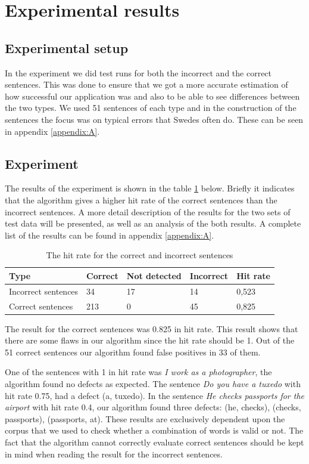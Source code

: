 \documentclass[a4paper,12pt]{article}
\begin{document}
\section{Experimental results}
\label{sec:experimentalresults}

\subsection{Experimental setup}
In the experiment we did test runs for both the incorrect and the correct sentences. This was done to ensure that we got a more accurate estimation of how successful our application was and also to be able to see differences between the two types. We used 51 sentences of each type and in the construction of the sentences the focus was on typical errors that Swedes often do. These can be seen in appendix \ref{appendix:A}.

\subsection{Experiment}
The results of the experiment is shown in the table \ref{table:results} below. Briefly it indicates that the algorithm gives a higher hit rate of the correct sentences than the incorrect sentences. A more detail description of the results for the two sets of test data will be presented, as well as an analysis of the both results. A complete list of the results can be found in appendix \ref{appendix:A}.

\begin{table}[h]
\begin{center}
\begin{tabular}{lllll}
\hline
Type & Correct & Not detected & Incorrect & Hit rate \\
\hline
Incorrect sentences & 34 & 17 & 14 & 0,523  \\
Correct sentences & 213 & 0 & 45 & 0,825  \\
\hline
\end{tabular}
\caption[Table caption text]{The hit rate for the correct and incorrect sentences}
\label{table:results}
\end{center}
\end{table}

The result for the correct sentences was 0.825 in hit rate. This result shows that there are some flaws in our algorithm since the hit rate should be 1. Out of the 51 correct sentences our algorithm found false positives in 33 of them.

One of the sentences with 1 in hit rate was \emph{I work as a photographer}, the algorithm found no defects as expected. The sentence \emph{Do you have a tuxedo} with hit rate 0.75, had a defect (a, tuxedo). In the sentence \emph{He checks passports for the airport} with hit rate 0.4, our algorithm found three defects: (he, checks), (checks, passports), (passports, at). These results are exclusively dependent upon the corpus that we used to check whether a combination of words is valid or not. The fact that the algorithm cannot correctly evaluate correct sentences should be kept in mind when reading the result for the incorrect sentences.
\end{document}
